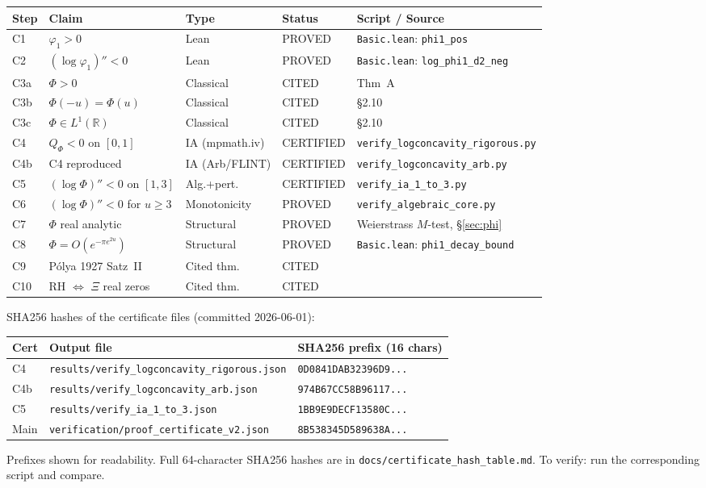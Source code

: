 \documentclass[11pt]{article}
\theoremstyle{definition}
\theoremstyle{remark}
\begin{document}
\begin{center}\small
\begin{tabularx}{\textwidth}{@{}lXllp{3.0cm}@{}}
\toprule
Step & Claim & Type & Status & Script / Source \\
\midrule
C1 & $\varphi_1 > 0$ & Lean & PROVED & \texttt{Basic.lean}: \texttt{phi1\_pos} \\
C2 & $(\log\varphi_1)'' < 0$ & Lean & PROVED & \texttt{Basic.lean}: \texttt{log\_phi1\_d2\_neg} \\
C3a & $\Phi > 0$ & Classical & CITED & \cite{csordas1989} Thm~A \\
C3b & $\Phi(-u)=\Phi(u)$ & Classical & CITED & \cite{titchmarsh1986} \S2.10 \\
C3c & $\Phi \in L^1(\mathbb{R})$ & Classical & CITED & \cite{titchmarsh1986} \S2.10 \\
C4 & $Q_\Phi < 0$ on $[0,1]$ & IA (mpmath.iv) & CERTIFIED & \texttt{verify\_logconcavity\_rigorous.py} \\
C4b & C4 reproduced & IA (Arb/FLINT) & CERTIFIED & \texttt{verify\_logconcavity\_arb.py} \\
C5 & $(\log\Phi)'' < 0$ on $[1,3]$ & Alg.+pert. & CERTIFIED & \texttt{verify\_ia\_1\_to\_3.py} \\
C6 & $(\log\Phi)'' < 0$ for $u\geq 3$ & Monotonicity & PROVED & \texttt{verify\_algebraic\_core.py} \\
C7 & $\Phi$ real analytic & Structural & PROVED & Weierstrass $M$-test, \S\ref{sec:phi} \\
C8 & $\Phi = O(e^{-\pi e^{2u}})$ & Structural & PROVED & \texttt{Basic.lean}: \texttt{phi1\_decay\_bound} \\
C9 & P\'olya 1927 Satz~II & Cited thm. & CITED & \cite[Thm.~2.2]{csordas1989} \\
C10 & RH $\Leftrightarrow$ $\Xi$ real zeros & Cited thm. & CITED & \cite[\S2.1]{titchmarsh1986} \\
\bottomrule
\end{tabularx}
\end{center}

SHA256 hashes of the certificate files (committed 2026-06-01):
\begin{center}\small
\begin{tabularx}{\textwidth}{@{}lXl@{}}
\toprule
Cert & Output file & SHA256 prefix (16 chars) \\
\midrule
C4 & \texttt{results/verify\_logconcavity\_rigorous.json} & \texttt{0D0841DAB32396D9...} \\
C4b & \texttt{results/verify\_logconcavity\_arb.json} & \texttt{974B67CC58B96117...} \\
C5 & \texttt{results/verify\_ia\_1\_to\_3.json} & \texttt{1BB9E9DECF13580C...} \\
Main & \texttt{verification/proof\_certificate\_v2.json} & \texttt{8B538345D589638A...} \\
\bottomrule
\end{tabularx}
\end{center}
Prefixes shown for readability. Full 64-character SHA256 hashes are in \texttt{docs/certificate\_hash\_table.md}. To verify: run the corresponding script and compare.
\end{document}
